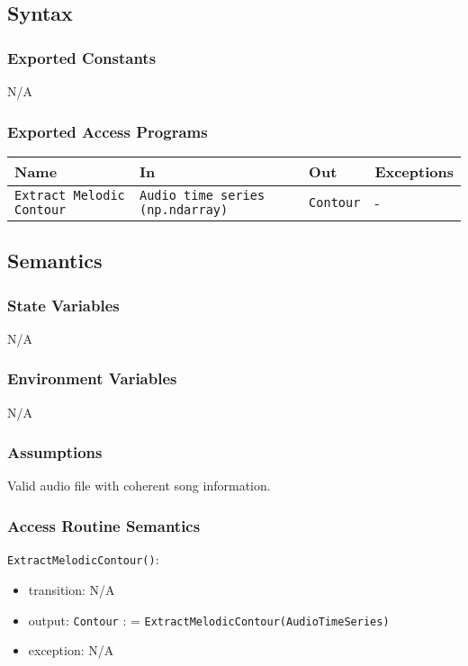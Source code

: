 \documentclass[12pt, titlepage]{article}
\begin{document}
\subsection{Syntax}

\subsubsection{Exported Constants}
N/A

\subsubsection{Exported Access Programs}

\begin{center}
\begin{tabular}{p{2cm} p{4cm} p{4cm} p{2cm}}
\hline
\textbf{Name} & \textbf{In} & \textbf{Out} & \textbf{Exceptions}\\
\hline%
\texttt{Extract Melodic Contour} &\texttt{Audio time series (np.ndarray)} &\texttt{Contour} &-\\
\hline
\end{tabular}
\end{center}

\subsection{Semantics}

\subsubsection{State Variables}
N/A

\subsubsection{Environment Variables}
N/A

\subsubsection{Assumptions}
Valid audio file with coherent song information.

\subsubsection{Access Routine Semantics}

\noindent \texttt{ExtractMelodicContour()}:
\begin{itemize}
\item transition: N/A 
\item output: \texttt{Contour} : = \texttt{ExtractMelodicContour(Audio\textunderscore Time\textunderscore Series)}
\item exception: N/A
\end{itemize}
\end{document}
